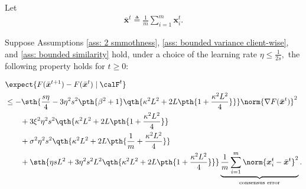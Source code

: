 \documentclass[letterpaper, 10 pt, conference]{ieeeconf}  %
\newcommand{\x}{{\bm x}}
\begin{document}
Let 
\begin{align}
\label{eq: average estimate}
\bar{\x}^t \triangleq \frac{1}{m}\sum_{i=1}^m \x_i^t. 
\end{align}
\begin{lemma}
\label{lemma: descent lemma}
Suppose Assumptions \ref{ass: 2 smmothness}, \ref{ass: bounded variance client-wise}, and \ref{ass: bounded similarity} hold, 
under a choice of the learning rate $\eta \le \frac{1}{2s},$ 
the following property holds for $t\ge 0:$
\begin{small}
\begin{align*}
&\expect{F(\bar{\x}^{t+1})  -  F(\bar{\x}^{t}) \mid \calF^{t}}\\ 
& \le - \sth{\frac{s\eta}{4} - 3 \eta^2 s^2 \pth{\beta^2 + 1}\qth{\kappa^2 L^2 + 2L \pth{1 + \frac{\kappa^2 L^2}{4}}}} \norm{\nabla F(\bar{\x}^t)}^2\\
\nonumber
& \qquad  +  3\xi^2 \eta^2 s^2 \qth{\kappa^2 L^2 + 2L \pth{1 + \frac{\kappa^2 L^2}{4}}} \\
& \qquad + \sigma^2 \eta^2 s^2 \qth{\kappa^2 L^2 + 2 L \pth{\frac{1}{m} + \frac{\kappa^2 L^2}{4}}}\\
& \qquad +  \sth{\eta s L^2 + 3\eta^2 s^2 L^2\qth{\kappa^2 L^2 + 2L \pth{1 + \frac{\kappa^2 L^2}{4}}}} \underbrace{\frac{1}{m} \sum_{i=1}^m \norm{\x_i^t - \bar{\x}^t}^2}_{\text{consensus error}}.
\end{align*}
\end{small}
\end{lemma}
\end{document}
